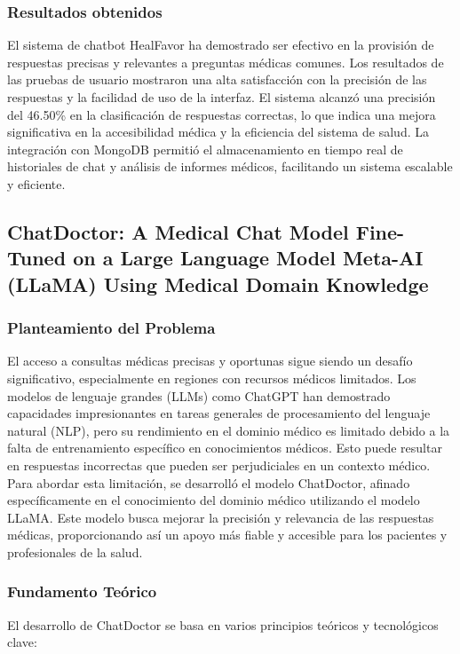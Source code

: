 \subsubsection{Resultados obtenidos}
	El sistema de chatbot HealFavor ha demostrado ser efectivo en la provisión de respuestas precisas y relevantes a preguntas médicas comunes. Los resultados de las pruebas de usuario mostraron una alta satisfacción con la precisión de las respuestas y la facilidad de uso de la interfaz. El sistema alcanzó una precisión del 46.50\% en la clasificación de respuestas correctas, lo que indica una mejora significativa en la accesibilidad médica y la eficiencia del sistema de salud. La integración con MongoDB permitió el almacenamiento en tiempo real de historiales de chat y análisis de informes médicos, facilitando un sistema escalable y eficiente.

\subsection{ChatDoctor: A Medical Chat Model Fine-Tuned on a Large Language Model Meta-AI (LLaMA) Using Medical Domain Knowledge \citep*{chatdoctor}} 
\subsubsection{Planteamiento del Problema}
	El acceso a consultas médicas precisas y oportunas sigue siendo un desafío significativo, especialmente en regiones con recursos médicos limitados. Los modelos de lenguaje grandes (LLMs) como ChatGPT han demostrado capacidades impresionantes en tareas generales de procesamiento del lenguaje natural (NLP), pero su rendimiento en el dominio médico es limitado debido a la falta de entrenamiento específico en conocimientos médicos. Esto puede resultar en respuestas incorrectas que pueden ser perjudiciales en un contexto médico. Para abordar esta limitación, se desarrolló el modelo ChatDoctor, afinado específicamente en el conocimiento del dominio médico utilizando el modelo LLaMA. Este modelo busca mejorar la precisión y relevancia de las respuestas médicas, proporcionando así un apoyo más fiable y accesible para los pacientes y profesionales de la salud.

\subsubsection{Fundamento Teórico}
El desarrollo de ChatDoctor se basa en varios principios teóricos y tecnológicos clave:

